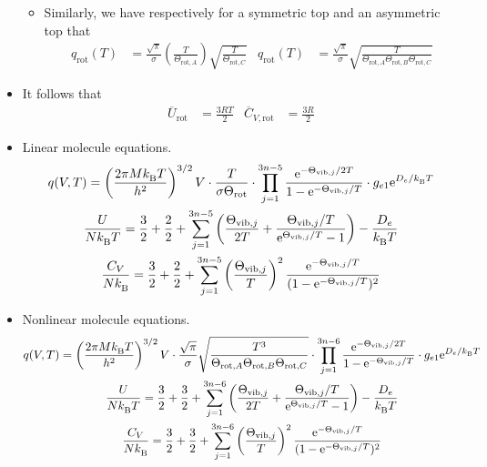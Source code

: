 \documentclass[../notes.tex]{subfiles}
\begin{document}
\begin{itemize}
\begin{itemize}
\begin{itemize}
        \end{itemize}
        \item Similarly, we have respectively for a symmetric top and an asymmetric top that
        \begin{align*}
            q_\text{rot}(T) &= \frac{\sqrt{\pi}}{\sigma}\left( \frac{T}{\Theta_{\text{rot},A}} \right)\sqrt{\frac{T}{\Theta_{\text{rot},C}}}&
            q_\text{rot}(T) &= \frac{\sqrt{\pi}}{\sigma}\sqrt{\frac{T}{\Theta_{\text{rot},A}\Theta_{\text{rot},B}\Theta_{\text{rot},C}}}
        \end{align*}
    \end{itemize}
    \item It follows that
    \begin{align*}
        \overline{U}_\text{rot} &= \frac{3RT}{2}&
        \overline{C}_{V,\text{rot}} &= \frac{3R}{2}
    \end{align*}
    \item Linear molecule equations.
    \begin{gather*}
        q(V,T) = \left( \frac{2\pi M\kB T}{h^2} \right)^{3/2}V\cdot\frac{T}{\sigma\Theta_\text{rot}}\cdot\prod_{j=1}^{3n-5}\frac{\e[-\Theta_{\text{vib},j}/2T]}{1-\e[-\Theta_{\text{vib},j}/T]}\cdot g_{e1}\e[D_e/\kB T]\\
        \frac{U}{N\kB T} = \frac{3}{2}+\frac{2}{2}+\sum_{j=1}^{3n-5}\left( \frac{\Theta_{\text{vib},j}}{2T}+\frac{\Theta_{\text{vib},j}/T}{\e[\Theta_{\text{vib},j}/T]-1} \right)-\frac{D_e}{\kB T}\\
        \frac{C_V}{N\kB} = \frac{3}{2}+\frac{2}{2}+\sum_{j=1}^{3n-5}\left( \frac{\Theta_{\text{vib},j}}{T} \right)^2\frac{\e[-\Theta_{\text{vib},j}/T]}{(1-\e[-\Theta_{\text{vib},j}/T])^2}
    \end{gather*}
    \item Nonlinear molecule equations.
    \begin{gather*}
        q(V,T) = \left( \frac{2\pi M\kB T}{h^2} \right)^{3/2}V\cdot\frac{\sqrt{\pi}}{\sigma}\sqrt{\frac{T^3}{\Theta_{\text{rot},A}\Theta_{\text{rot},B}\Theta_{\text{rot},C}}}\cdot\prod_{j=1}^{3n-6}\frac{\e[-\Theta_{\text{vib},j}/2T]}{1-\e[-\Theta_{\text{vib},j}/T]}\cdot g_{e1}\e[D_e/\kB T]\\
        \frac{U}{N\kB T} = \frac{3}{2}+\frac{3}{2}+\sum_{j=1}^{3n-6}\left( \frac{\Theta_{\text{vib},j}}{2T}+\frac{\Theta_{\text{vib},j}/T}{\e[\Theta_{\text{vib},j}/T]-1} \right)-\frac{D_e}{\kB T}\\
        \frac{C_V}{N\kB} = \frac{3}{2}+\frac{3}{2}+\sum_{j=1}^{3n-6}\left( \frac{\Theta_{\text{vib},j}}{T} \right)^2\frac{\e[-\Theta_{\text{vib},j}/T]}{(1-\e[-\Theta_{\text{vib},j}/T])^2}
    \end{gather*}
\end{itemize}
\end{document}

